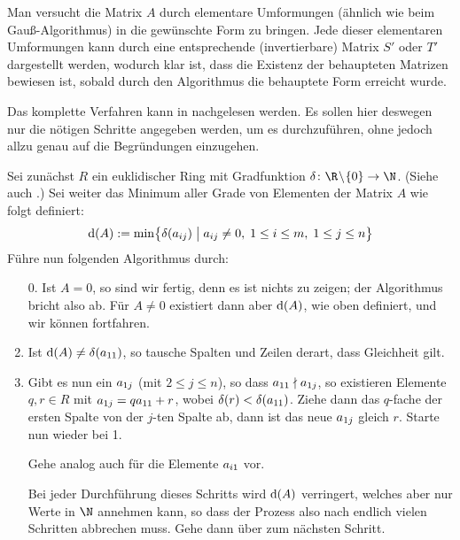 \begin{proofsketch}
    Man versucht die Matrix $A$ durch elementare Umformungen (ähnlich wie beim
    Gauß-Algorithmus) in die gewünschte Form zu bringen. Jede dieser elementaren
    Umformungen kann durch eine entsprechende (invertierbare) Matrix $S'$ oder
    $T'$ dargestellt werden, wodurch klar ist, dass die Existenz der behaupteten
    Matrizen bewiesen ist, sobald durch den Algorithmus die behauptete Form
    erreicht wurde.
    
    Das komplette Verfahren kann in \cite[S.\,211, Lemma~5]{bookc:bosch08}
    nachgelesen werden. Es sollen hier deswegen nur die nötigen Schritte
    angegeben werden, um es durchzuführen, ohne jedoch allzu genau auf die
    Begründungen einzugehen.
    
    Sei zunächst $R$ ein euklidischer Ring mit Gradfunktion
    $\delta\colon\R\!\setminus\!\{0\}\to\N$. 
    (Siehe auch \cite[Def.~4]{talk:rief}.) %
    Sei weiter das Minimum aller Grade von Elementen der Matrix $A$ wie folgt
    definiert:
    \[ \mathrm{d}(A) := \min\bigl\{ \delta(a_{ij}) \;\big\vert\; a_{ij}\neq0,\;
                            1\leq i\leq m, \; 1\leq j\leq n \bigr\}    \]
    Führe nun folgenden Algorithmus durch:
    \begin{enumerate}[1.]
        \item[0.]
            Ist $A=0$, so sind wir fertig, denn es ist nichts zu zeigen;
            der Algorithmus bricht also ab.
            Für $A\neq0$ existiert dann aber $\mathrm{d}(A)$, wie oben definiert, und
            wir können fortfahren.
            
        \item 
            Ist $\mathrm{d}(A) \neq \delta(a_{11})$, so tausche Spalten und Zeilen
            derart, dass Gleichheit gilt.
            
        \item
            Gibt es nun ein $a_{1j}$ (mit $2\leq j\leq n$), so dass 
            $a_{11} \nmid a_{1j}$, so existieren Elemente $q,r\in R$ mit $a_{1j} =
            qa_{11} + r$, wobei $\delta(r) < \delta(a_{11})$. Ziehe dann das
            $q$-fache der ersten Spalte von der $j$-ten Spalte ab, dann ist das
            neue $a_{1j}$ gleich $r$. Starte nun wieder bei 1.
            
            Gehe analog auch für die Elemente $a_{i1}$ vor.
            
            Bei jeder Durchführung dieses Schritts wird $\mathrm{d}(A)$ verringert,
            welches aber nur Werte in $\N$ annehmen kann, so dass der Prozess
            also nach endlich vielen Schritten abbrechen muss. Gehe dann über
            zum nächsten Schritt.
            

\end{enumerate}
\end{proofsketch}
